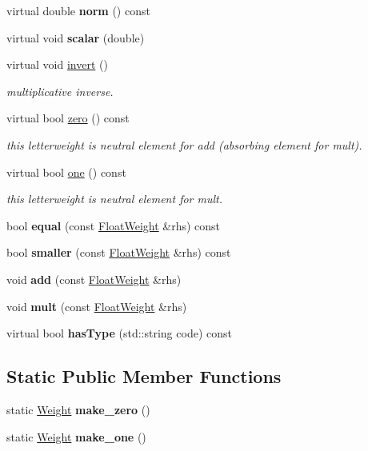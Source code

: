 \begin{DoxyCompactItemize}
\mbox{\label{classFloatWeight_a2c63d370c10678609f814907193b23ee}} 
virtual double {\bfseries norm} () const
\item 
virtual void {\bfseries scalar} (double)
\item 
virtual void \mbox{\hyperlink{group__weight_ga45533bb9d354577728ddb1e0a42c4bab}{invert}} ()
\begin{DoxyCompactList}\small\item\em multiplicative inverse. \end{DoxyCompactList}\item 
virtual bool \mbox{\hyperlink{group__weight_gafb9e6bffef57c6462cd2eea89efbfeaf}{zero}} () const
\begin{DoxyCompactList}\small\item\em this letterweight is neutral element for add (absorbing element for mult). \end{DoxyCompactList}\item 
virtual bool \mbox{\hyperlink{group__weight_gac90a90f052aba6f1a03a5238bae96159}{one}} () const
\begin{DoxyCompactList}\small\item\em this letterweight is neutral element for mult. \end{DoxyCompactList}\item 
bool {\bfseries equal} (const \mbox{\hyperlink{classFloatWeight}{Float\+Weight}} \&rhs) const
\item 
bool {\bfseries smaller} (const \mbox{\hyperlink{classFloatWeight}{Float\+Weight}} \&rhs) const
\item 
void {\bfseries add} (const \mbox{\hyperlink{classFloatWeight}{Float\+Weight}} \&rhs)
\item 
void {\bfseries mult} (const \mbox{\hyperlink{classFloatWeight}{Float\+Weight}} \&rhs)
\item 
\mbox{\label{classFloatWeight_ab0d05685ad9a718cc9020a55d2932486}} 
virtual bool {\bfseries has\+Type} (std\+::string code) const
\end{DoxyCompactItemize}
\subsection*{Static Public Member Functions}
\begin{DoxyCompactItemize}
\item 
\mbox{\label{classFloatWeight_abb38e7b190994886e7e76368fdd5f249}} 
static \mbox{\hyperlink{classWeight}{Weight}} {\bfseries make\+\_\+zero} ()
\item 
\mbox{\label{classFloatWeight_a3f2f798acf432ffe014a71be26b800a8}} 
static \mbox{\hyperlink{classWeight}{Weight}} {\bfseries make\+\_\+one} ()
\end{DoxyCompactItemize}
